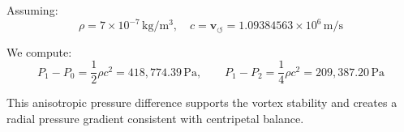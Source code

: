 \documentclass[12pt]{article}
\begin{document}
    \begin{tcolorbox}[colback=gray!10, colframe=black, title=Example: Vortex Pressure Drop]

        Assuming:
        \[
            \rho = 7 \times 10^{-7} \, \mathrm{kg/m^3}, \quad c = \mathbf{v}_{\scriptscriptstyle\boldsymbol{\circlearrowleft}} = 1.09384563 \times 10^6 \, \mathrm{m/s}
        \]

        We compute:
        \[
            P_1 - P_0 = \frac{1}{2} \rho c^2 = \boxed{418{,}774.39 \, \mathrm{Pa}}, \qquad
            P_1 - P_2 = \frac{1}{4} \rho c^2 = \boxed{209{,}387.20 \, \mathrm{Pa}}
        \]

        This anisotropic pressure difference supports the vortex stability and creates a radial pressure gradient consistent with centripetal balance.
    \end{tcolorbox}


    \ifdefined\standalonechapter
    \else
    
    
    
\end{document}
